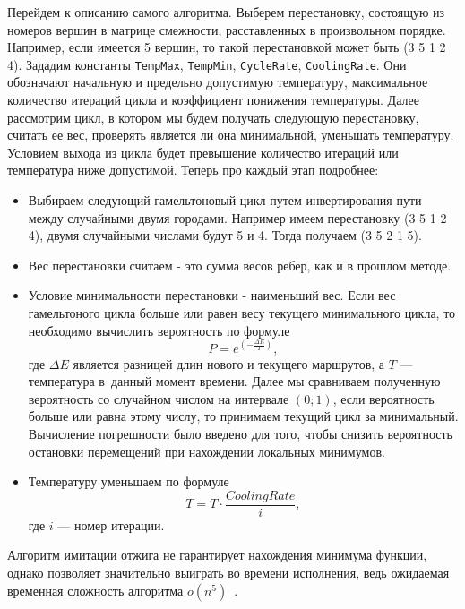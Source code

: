 \documentclass[12pt, a4paper]{article}
\begin{document}
Перейдем к описанию самого алгоритма. Выберем перестановку, состоящую из номеров вершин в матрице смежности, расставленных в произвольном порядке. Например, если имеется 5 вершин, то такой перестановкой может быть (3 5 1 2 4). Зададим константы \texttt{TempMax}, \texttt{TempMin},  \texttt{CycleRate}, \texttt{CoolingRate}. Они обозначают начальную и предельно допустимую температуру, максимальное количество итераций цикла и коэффициент понижения температуры.
Далее рассмотрим цикл, в котором мы будем получать следующую перестановку, считать ее вес, проверять является ли она минимальной, уменьшать температуру. Условием выхода из цикла будет превышение количество итераций или температура ниже допустимой. Теперь про каждый этап подробнее:
\begin{itemize}
	\item Выбираем следующий гамельтоновый цикл путем инвертирования пути между случайными двумя городами. Например имеем перестановку (3 5 1 2 4), двумя случайными числами будут 5 и 4. Тогда получаем (3 5 2 1 5).
	\item Вес перестановки считаем - это сумма весов ребер, как и в прошлом методе.
	\item Условие минимальности перестановки - наименьший вес. Если вес гамельтоного цикла больше или равен весу текущего минимального цикла, то необходимо вычислить вероятность по формуле 
	\begin{equation}
		\label{prob}
		P=e^{\left(-\frac{\Delta E}{T}\right)},
	\end{equation}
	где $\Delta E$ является разницей длин нового и текущего маршрутов, а $T$ --- температура в~данный момент времени. Далее мы сравниваем полученную вероятность со случайном числом на интервале $(0; 1)$, если вероятность больше или равна этому числу, то принимаем текущий цикл за минимальный. Вычисление погрешности было введено для того, чтобы снизить вероятность остановки перемещений при нахождении локальных минимумов.
	\item Температуру уменьшаем по формуле
	\[
		T = T \cdot \frac{CoolingRate}{i},
	\]
	где $i$ --- номер итерации. 
\end{itemize}

Алгоритм имитации отжига не гарантирует нахождения минимума функции, однако позволяет значительно выиграть во времени исполнения, ведь ожидаемая временная сложность алгоритма $o(n^5)$~\cite{mitpaper}.
\end{document}
